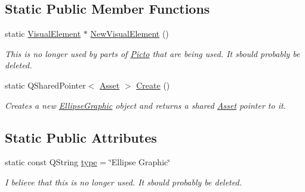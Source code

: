 \subsection*{Static Public Member Functions}
\begin{DoxyCompactItemize}
\item 
\hypertarget{class_picto_1_1_ellipse_graphic_a9b54dfe1023ee21fab2d20c2e8779858}{static \hyperlink{struct_picto_1_1_visual_element}{Visual\-Element} $\ast$ \hyperlink{class_picto_1_1_ellipse_graphic_a9b54dfe1023ee21fab2d20c2e8779858}{New\-Visual\-Element} ()}\label{class_picto_1_1_ellipse_graphic_a9b54dfe1023ee21fab2d20c2e8779858}

\begin{DoxyCompactList}\small\item\em This is no longer used by parts of \hyperlink{namespace_picto}{Picto} that are being used. It sbould probably be deleted. \end{DoxyCompactList}\item 
\hypertarget{class_picto_1_1_ellipse_graphic_adadf946be619231c3ccd9b3c8ba5954d}{static Q\-Shared\-Pointer$<$ \hyperlink{class_picto_1_1_asset}{Asset} $>$ \hyperlink{class_picto_1_1_ellipse_graphic_adadf946be619231c3ccd9b3c8ba5954d}{Create} ()}\label{class_picto_1_1_ellipse_graphic_adadf946be619231c3ccd9b3c8ba5954d}

\begin{DoxyCompactList}\small\item\em Creates a new \hyperlink{class_picto_1_1_ellipse_graphic}{Ellipse\-Graphic} object and returns a shared \hyperlink{class_picto_1_1_asset}{Asset} pointer to it. \end{DoxyCompactList}\end{DoxyCompactItemize}
\subsection*{Static Public Attributes}
\begin{DoxyCompactItemize}
\item 
\hypertarget{class_picto_1_1_ellipse_graphic_adb8ea1463bc28539c891f14fd72fa140}{static const Q\-String \hyperlink{class_picto_1_1_ellipse_graphic_adb8ea1463bc28539c891f14fd72fa140}{type} = \char`\"{}Ellipse Graphic\char`\"{}}\label{class_picto_1_1_ellipse_graphic_adb8ea1463bc28539c891f14fd72fa140}

\begin{DoxyCompactList}\small\item\em I believe that this is no longer used. It sbould probably be deleted. \end{DoxyCompactList}\end{DoxyCompactItemize}
